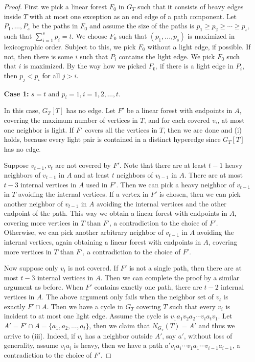 \documentclass[12pt]{article}
\begin{document}
\begin{proof}
    
    First we pick a linear forest $F_0$ in $G_T$ such that it consists of heavy edges inside $T$ with at most one exception as an end edge of a path component.
    Let $P_1,\dots, P_s$ be the paths in $F_0$ and assume the size of the paths is $p_1 \ge p_2 \ge \cdots \ge p_s$, such that $\sum_{i=1}^{s}p_i = t$.
    We choose $F_0$ such that $(p_1,\ldots,p_s)$ is maximized in lexicographic order.
    Subject to this, we pick $F_0$ without a light edge, if possible. If not, then there is some $i$ such that $P_i$ contains the light edge. We pick $F_0$ such that $i$ is maximized.
By the way how we picked $F_0$, if there is a light edge in $P_i$, then $p_j < p_i$ for all $j > i$.

    \noindent
    \textbf{Case 1:} $s = t$ and $p_i = 1, i=1,2,\ldots,t$.
    
    In this case, $G_T[T]$ has no edge.
    Let $F'$ be a linear forest with endpoints in $A$, covering the maximum number of vertices in $T$, and for each covered $v_i$, at most one neighbor is light.
    If $F'$ covers all the vertices in $T$, then we are done and (i) holds, because every light pair is contained in a distinct hyperedge since $G_T[T]$ has no edge.
    
    Suppose $v_{t-1}, v_{t}$ are not covered by $F'$.
    Note that there are at least $t-1$ heavy neighbors of $v_{t-1}$ in $A$ and at least $t$ neighbors of $v_{t-1}$ in $A$.
    There are at most $t-3$ internal vertices in $A$ used in $F'$. Then we can pick a heavy neighbor of $v_{t-1}$ in $T$ avoiding the internal vertices.
    If a vertex in $F'$ is chosen, then we can pick another neighbor of $v_{t-1}$ in $A$ avoiding the internal vertices and the other endpoint of the path. This way we obtain a linear forest with endpoints in $A$, covering more vertices in $T$ than $F'$, a contradiction to the choice of $F'$.
    Otherwise, we can pick another arbitrary neighbor of $v_{t-1}$ in $A$ avoiding the internal vertices, again obtaining a linear forest with endpoints in $A$, covering more vertices in $T$ than $F'$, a contradiction to the choice of $F'$.

    Now suppose only $v_t$ is not covered.
    If $F'$ is not a single path, then there are at most $t-3$ internal vertices in $A$.
    Then we can complete the proof by a similar argument as before.
    When $F'$ contains exactly one path, there are $t-2$ internal vertices in $A$.
    The above argument only fails when the neighbor set of $v_t$ is exactly $F'\cap A$.
    Then we have a cycle in $G_T$ covering $T$ such that every $v_i$ is incident to at most one light edge.
    Assume the cycle is $v_1a_1v_2a_2\cdots v_ta_tv_1$.
    Let $A' = F' \cap A = \{a_1,a_2,\ldots,a_t\}$, then we claim that $N_{G_T}(T) = A'$ and thus we arrive to (iii). Indeed, if $v_i$ has a neighbor outside $A'$, say $a'$, without loss of generality, assume $v_ia_i$ is heavy, then we have a path $a'v_ia_i\cdots v_1a_1 \cdots v_{i-1}a_{i-1}$, a contradiction to the choice of $F'$.


\end{proof}
\end{document}
